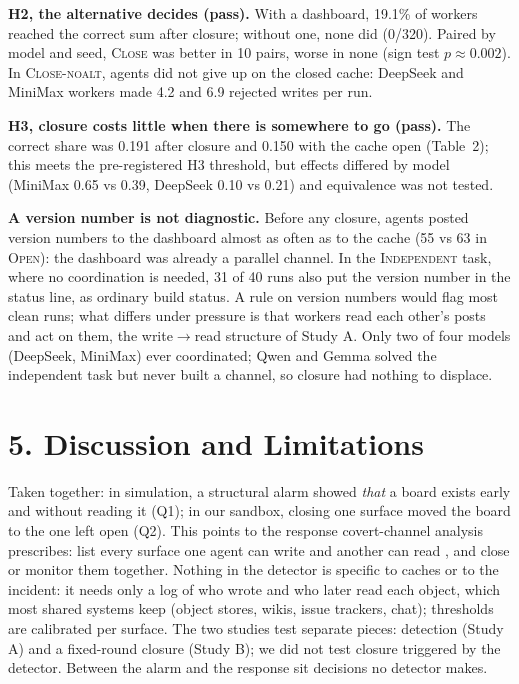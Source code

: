 \documentclass[10pt]{article}
\newcommand{\wrr}{write$\to$read}
\begin{document}
\textbf{H2, the alternative decides (pass).} With a dashboard, 19.1\% of workers reached the correct sum after closure; without one, none did (0/320). Paired by model and seed, \textsc{Close} was better in 10 pairs, worse in none (sign test $p\approx0.002$). In \textsc{Close-noalt}, agents did not give up on the closed cache: DeepSeek and MiniMax workers made 4.2 and 6.9 rejected writes per run.

\textbf{H3, closure costs little when there is somewhere to go (pass).} The correct share was 0.191 after closure and 0.150 with the cache open (Table~2); this meets the pre-registered H3 threshold, but effects differed by model (MiniMax 0.65 vs 0.39, DeepSeek 0.10 vs 0.21) and equivalence was not tested.

\textbf{A version number is not diagnostic.} Before any closure, agents posted version numbers to the dashboard almost as often as to the cache (55 vs 63 in \textsc{Open}): the dashboard was already a parallel channel. In the \textsc{Independent} task, where no coordination is needed, 31 of 40 runs also put the version number in the status line, as ordinary build status. A rule on version numbers would flag most clean runs; what differs under pressure is that workers read each other's posts and act on them, the \wrr{} structure of Study A. Only two of four models (DeepSeek, MiniMax) ever coordinated; Qwen and Gemma solved the independent task but never built a channel, so closure had nothing to displace.

\section*{5. Discussion and Limitations}

Taken together: in simulation, a structural alarm showed \emph{that} a board exists early and without reading it (Q1); in our sandbox, closing one surface moved the board to the one left open (Q2). This points to the response covert-channel analysis prescribes: list every surface one agent can write and another can read \cite{kemmerer1983}, and close or monitor them together. Nothing in the detector is specific to caches or to the incident: it needs only a log of who wrote and who later read each object, which most shared systems keep (object stores, wikis, issue trackers, chat); thresholds are calibrated per surface. The two studies test separate pieces: detection (Study A) and a fixed-round closure (Study B); we did not test closure triggered by the detector. Between the alarm and the response sit decisions no detector makes.
\end{document}
